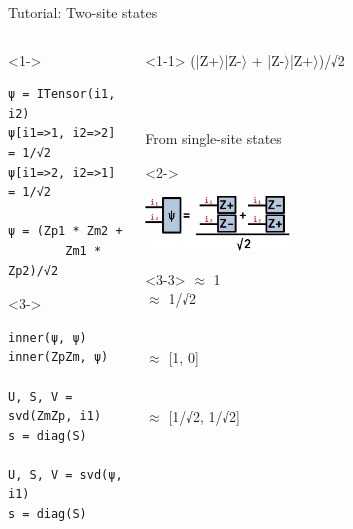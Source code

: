 \begin{frame}[fragile]{Tutorial: Two-site states}

\begin{columns}

\begin{column}{5cm}

\begin{onlyenv}<1->
\begin{lstlisting}[language=JuliaLocal, style=julia, basicstyle=\small]
ψ = ITensor(i1, i2)
ψ[i1=>1, i2=>2] = 1/√2
ψ[i1=>2, i2=>1] = 1/√2

ψ = (Zp1 * Zm2 +
        Zm1 * Zp2)/√2
\end{lstlisting}
\end{onlyenv}

\begin{onlyenv}<3->
\begin{lstlisting}[language=JuliaLocal, style=julia, basicstyle=\small]
inner(ψ, ψ)
inner(ZpZm, ψ)

U, S, V = svd(ZmZp, i1)
s = diag(S)

U, S, V = svd(ψ, i1)
s = diag(S)
\end{lstlisting}
\end{onlyenv}

\end{column}

\begin{column}{5cm}

\begin{onlyenv}<1-1>
(|Z+$\rangle$|Z-$\rangle$ + |Z-$\rangle$|Z+$\rangle$)/√2 \\
~\\
~\\
~\\
From single-site states \\
\end{onlyenv}

\begin{onlyenv}<2->
\vspace*{0.0cm}
\begin{center}
\includegraphics[width=0.2\textwidth]{
  slides/assets/cat12.png
}
\end{center}
\vspace*{0.0cm}
\end{onlyenv}

\begin{onlyenv}<3-3>
$\approx$ 1 \\
$\approx$ 1/√2 \\
~\\
~\\
$\approx$ [1, 0] \\
~\\
~\\
$\approx$ [1/√2, 1/√2]
\end{onlyenv}


\end{column}
\end{columns}
\end{frame}
